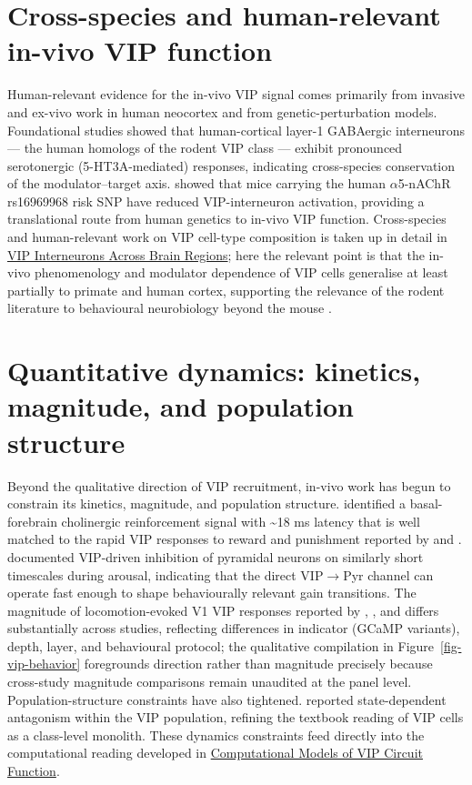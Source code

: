 \documentclass[11pt]{article}
\let\origrightarrow\rightarrow
\def\rightarrow{\ensuremath{\origrightarrow}}
\begin{document}
\section{Cross-species and human-relevant in-vivo VIP function}

Human-relevant evidence for the in-vivo VIP signal comes primarily from invasive and ex-vivo work in human neocortex and from genetic-perturbation models. Foundational studies \citep{Poorthuis2018} showed that human-cortical layer-1 GABAergic interneurons --- the human homologs of the rodent VIP class --- exhibit pronounced serotonergic (5-HT3A-mediated) responses, indicating cross-species conservation of the modulator--target axis. \citet{Koukouli2017} showed that mice carrying the human $\alpha$5-nAChR rs16969968 risk SNP have reduced VIP-interneuron activation, providing a translational route from human genetics to in-vivo VIP function. Cross-species and human-relevant work on VIP cell-type composition is taken up in detail in \href{/cross-areas}{VIP Interneurons Across Brain Regions}; here the relevant point is that the in-vivo phenomenology and modulator dependence of VIP cells generalise at least partially to primate and human cortex, supporting the relevance of the rodent literature to behavioural neurobiology beyond the mouse \citep{Poorthuis2018, Koukouli2017, Lecrux2016}.

\section{Quantitative dynamics: kinetics, magnitude, and population structure}

Beyond the qualitative direction of VIP recruitment, in-vivo work has begun to constrain its kinetics, magnitude, and population structure. \citet{Hangya2015} identified a basal-forebrain cholinergic reinforcement signal with {\textasciitilde}18 ms latency that is well matched to the rapid VIP responses to reward and punishment reported by \citet{Pi2013} and \citet{Szadai2022}. \citet{Garciajuncoclemente2017} documented VIP-driven inhibition of pyramidal neurons on similarly short timescales during arousal, indicating that the direct VIP\rightarrow Pyr channel can operate fast enough to shape behaviourally relevant gain transitions. The magnitude of locomotion-evoked V1 VIP responses reported by \citet{Fu2014}, \citet{Pakan2016}, and \citet{Dipoppa2018} differs substantially across studies, reflecting differences in indicator (GCaMP variants), depth, layer, and behavioural protocol; the qualitative compilation in Figure~\ref{fig-vip-behavior} foregrounds direction rather than magnitude precisely because cross-study magnitude comparisons remain unaudited at the panel level. Population-structure constraints have also tightened. \citet{Kannan2022} reported state-dependent antagonism within the VIP population, refining the textbook reading of VIP cells as a class-level monolith. These dynamics constraints feed directly into the computational reading developed in \href{/computational-models}{Computational Models of VIP Circuit Function}.
\end{document}

